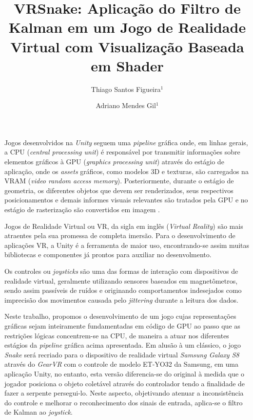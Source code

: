 \documentclass{vgtc}                          %
\title{VRSnake: Aplicação do Filtro de Kalman em um Jogo de Realidade Virtual com Visualização Baseada em Shader}
\author{Thiago Santos Figueira$^{1}$
\and Adriano Mendes Gil$^{1}$}
\affiliation{\scriptsize $^{1}$Samsung Instituto de Desenvolvimento para a Informática da Amazônia
  (SIDIA)\\
  Manaus -- AM -- Brazil\\}
\begin{document}

\maketitle

Jogos desenvolvidos na \textit{Unity} seguem uma \textit{pipeline} gráfica onde, em linhas gerais, a CPU (\textit{central processing unit}) é responsável por transmitir informações sobre elementos gráficos à GPU (\textit{graphics processing unit}) através do estágio de aplicação, onde os \textit{assets} gráficos, como modelos 3D e texturas, são carregados na VRAM (\textit{video random access memory}). Posteriormente, durante o estágio de geometria, os diferentes objetos que devem ser renderizados, seus respectivos posicionamentos e demais informes visuais relevantes são tratados pela GPU e no estágio de rasterização são convertidos em imagem \cite{akenine2008real}.

Jogos de Realidade Virtual ou VR, da sigla em inglês (\textit{Virtual Reality}) são mais atraentes pela sua promessa de completa imersão. Para o desenvolvimento de aplicações VR, a Unity é a ferramenta de maior uso, encontrando-se assim muitas bibliotecas e componentes já prontos para auxiliar no desenvolmento.

Os controles ou \textit{joysticks} são uma das formas de interação com dispositivos de realidade virtual, geralmente utilizando sensores baseados em magnetômetros, sendo assim passíveis de ruídos e originando comportamentos indesejados como imprecisão dos movimentos causada pelo \textit{jittering} durante a leitura dos dados.

Neste trabalho, propomos o desenvolvimento de um jogo cujas representações gráficas sejam inteiramente fundamentadas em código de GPU ao passo que as restrições lógicas concentrem-se na CPU, de maneira a atuar nos diferentes estágios da \textit{pipeline} gráfica acima apresentada. Em alusão à um clássico, o jogo \textit{Snake} será recriado para o dispositivo de realidade virtual \textit{Samsung Galaxy S8} através do \textit{GearVR} com o controle de modelo ET-YO32 da Samsung, em uma aplicação Unity, no entanto, esta versão diferencia-se do original à medida que o jogador posiciona o objeto coletável através do controlador tendo a finalidade de fazer a serpente persegui-lo. Neste aspecto, objetivando atenuar a inconsistência do controle e melhorar o reconhecimento dos sinais de entrada, aplica-se o filtro de Kalman ao \textit{joystick}.
\end{document}
